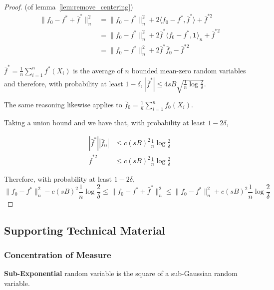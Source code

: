 \begin{proof} (of lemma~\ref{lem:remove_centering})
\begin{align*}
\| f_0 - f^* + \bar{f}^* \|_n^2 &= \| f_0 - f^* \|_n^2 
    + 2 \langle f_0 - f^*, \bar{f}^* \rangle + \bar{f}^{*2} \\
  &= \| f_0 - f^* \|_n^2 + 2 \bar{f}^* \langle f_0 - f^*, \mathbf{1} \rangle_n + 
    \bar{f}^{*2} \\
  &= \| f_0 - f^* \|_n^2 + 2 \bar{f}^* \bar{f}_0 - \bar{f}^{*2}
\end{align*}


$\bar{f}^* = \frac{1}{n} \sum_{i=1}^n f^*(X_i)$ is the average of $n$ bounded mean-zero random variables and therefore, with probability at least $1-\delta$, $| \bar{f}^* | \leq 4 sB \sqrt{ \frac{1}{n} \log \frac{2}{\delta} }$.

The same reasoning likewise applies to $\bar{f}_0 = \frac{1}{n} \sum_{i=1}^n f_0(X_i)$.

Taking a union bound and we have that, with probability at least $1- 2\delta$, 

\begin{align*}
| \bar{f}^* | | \bar{f}_0 | &\leq c (sB)^2 \frac{1}{n} \log \frac{2}{\delta} \\
\bar{f}^{*2} &\leq c (sB)^2 \frac{1}{n} \log \frac{2}{\delta}
\end{align*}

Therefore, with probability at least $1 - 2\delta$,
\[
\|f_0 - f^*\|_n^2 - c (sB)^2 \frac{1}{n} \log \frac{2}{\delta} \leq
    \| f_0 - f^* + \bar{f}^* \|_n^2 \leq 
\|f_0 - f^*\|_n^2 + c (sB)^2 \frac{1}{n} \log \frac{2}{\delta}
\]

\end{proof}





 \subsection{Supporting Technical Material}
 
 \subsubsection{Concentration of Measure}

\textbf{Sub-Exponential} random variable is the square of a sub-Gaussian random variable\cite{vershynin2010introduction}.

